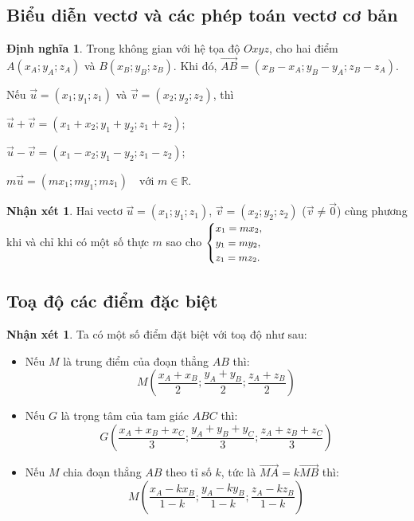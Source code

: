 \documentclass[12pt,a4paper,oneside]{book}
\theoremstyle{theorem}
\theoremstyle{definition}
\newtheorem{dn}[theorem2]{Định nghĩa}
\newtheorem{nx}[theorem2]{Nhận xét}
\begin{document}
    \subsection{Biểu diễn vectơ và các phép toán vectơ cơ bản}
    \begin{dn} Trong không gian với hệ tọa độ $Oxyz$, cho hai điểm
    $A(x_A;y_A;z_A)$ và $B(x_B;y_B;z_B)$. Khi đó, $\overrightarrow{AB}=(x_B-x_A;y_B-y_A;z_B-z_A).$
    
    Nếu $\vec{u}=(x_1;y_1;z_1)$ và $\vec{v}=(x_2;y_2;z_2)$, thì
    
    \hspace{4 cm} $\vec{u}+\vec{v}=(x_1+x_2;y_1+y_2;z_1+z_2);$
    
    \hspace{4 cm} $\vec{u}-\vec{v}=(x_1-x_2;y_1-y_2;z_1-z_2);$

    \hspace{4 cm} $m\vec{u}=(mx_1;my_1;mz_1) \quad \text{với } m\in\mathbb{R}.$
    \end{dn}
    \begin{nx} Hai vectơ $\vec{u}=(x_1;y_1;z_1)$,
    $\vec{v}=(x_2;y_2;z_2)$ ($\vec{v}\ne\vec{0}$) cùng phương khi và chỉ khi
    có một số thực $m$ sao cho
    $\small \begin{cases}
    x_1=mx_2,\\
    y_1=my_2,\\
    z_1=mz_2.
    \end{cases}$
    \end{nx}
    \subsection{Toạ độ các điểm đặc biệt}
    \begin{nx}
    Ta có một số điểm đặt biệt với toạ độ như sau:
        \begin{itemize}
            \item Nếu $M$ là trung điểm của đoạn thẳng $AB$ thì: 
            $$M\displaystyle \left(\frac{x_A+x_B}{2};\frac{y_A+y_B}{2};\frac{z_A+z_B}{2}\right)$$
            \item Nếu $G$ là trọng tâm của tam giác $ABC$ thì: 
            $$G\displaystyle \left(\frac{x_A+x_B+x_C}{3};\frac{y_A+y_B+y_C}{3};\frac{z_A+z_B+z_C}{3}\right)$$
            \item Nếu $M$ chia đoạn thẳng $AB$ theo tỉ số $k$, tức là 
            $\overrightarrow{MA}=k\overrightarrow{MB}$ thì: 
            $$M \displaystyle \left( \frac{x_A-kx_B}{1-k};\frac{y_A-ky_B}{1-k};\frac{z_A-kz_B}{1-k} \right)$$
        \end{itemize}
    \end{nx}
\end{document}
